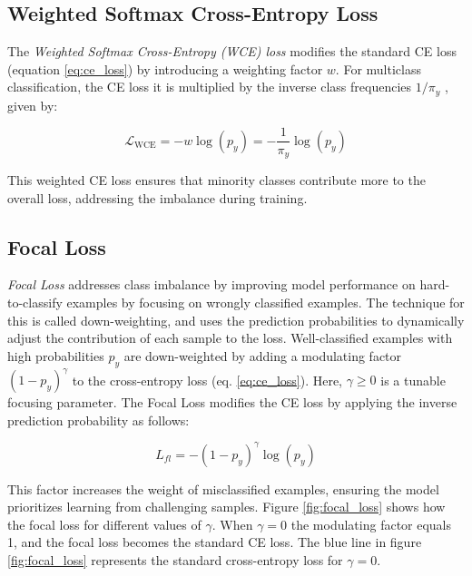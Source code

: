 \subsection{Weighted Softmax Cross-Entropy Loss}
\label{sec:wce_loss}
The \emph{Weighted Softmax Cross-Entropy (WCE) loss} modifies the standard CE loss (equation \eqref{eq:ce_loss}) by introducing a weighting factor $w$. For multiclass classification, the CE loss it is multiplied by the inverse class frequencies $1/\pi_y$ \cite{zhang2023deep,lin2018focallossdenseobject}, given by:

\begin{equation}
    \label{eq:wce_loss}
    \mathcal{L}_{\text{WCE}} = -w \log(p_y) = - \frac{1}{\pi_y} \log(p_y)
\end{equation}

This weighted CE loss ensures that minority classes contribute more to the overall loss, addressing the imbalance during training.


\subsection{Focal Loss}
\label{sec:fl}
\emph{Focal Loss} \cite{lin2018focallossdenseobject} addresses class imbalance by improving model performance on hard-to-classify examples by focusing on wrongly classified examples. The technique for this is called down-weighting, and uses the prediction probabilities to dynamically adjust the contribution of each sample to the loss. Well-classified examples with high probabilities $p_y$ are down-weighted by adding a modulating factor $(1 - p_y)^\gamma$ to the cross-entropy loss (eq. \eqref{eq:ce_loss}). Here, $\gamma \geq 0$ is a tunable focusing parameter. The Focal Loss modifies the CE loss by applying the inverse prediction probability as follows:

\begin{equation}
    \label{eq:focal_loss}
    L_{fl} = -(1 - p_y)^\gamma \log(p_y)
\end{equation}

This factor increases the weight of misclassified examples, ensuring the model prioritizes learning from challenging samples. Figure \ref{fig:focal_loss} shows how the focal loss for different values of $\gamma$. When $\gamma = 0$ the modulating factor equals 1, and the focal loss becomes the standard CE loss. The blue line in figure \ref{fig:focal_loss} represents the standard cross-entropy loss for $\gamma = 0$.

